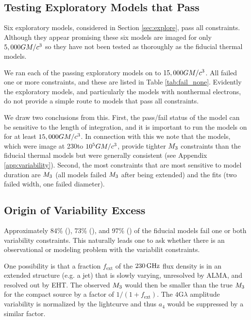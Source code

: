 \subsection{Testing Exploratory Models that Pass}

Six exploratory models, considered in Section \ref{sec:explore},  pass all constraints.  Although they appear promising these six models are imaged for only $5,000 GM/c^3$ so they have not been tested as thoroughly as the fiducial thermal models.  

We ran each of the passing exploratory models on to $15,000 GM/c^3$.  All failed one or more constraints, and these are listed in Table \ref{tab:fail_none}.  Evidently the exploratory models, and particularly the models with nonthermal electrons, do not provide a simple route to models that pass all constraints.  

We draw two conclusions from this.  First, the pass/fail status of the model can be sensitive to the length of integration, and it is important to run the models on for at least $15,000GM/c^3$.  In connection with this we note that the \koral models, which were image at 230\GHz to $10^5 GM/c^3$, provide tighter $M_{3}$ constraints than the fiducial thermal models but were generally consistent (see Appendix \ref{app:variability}).  Second, the most constraints that  are most sensitive to model duration are $M_{3}$ (all models failed $M_{3}$ after being extended) and the \mring fits (two failed \mring width, one failed \mring diameter). 

\subsection{Origin of Variability Excess}

Approximately 84\% (\kharma), 73\% (\bhac), and 97\% (\hamr) of the fiducial models fail one or both variability constraints.  This naturally leads one to ask whether there is an observational or modeling problem with the variabilit constraints.

One possibility is that a fraction $f_\mathrm{ext}$ of the $230\,\mathrm{GHz}$ flux density is in an extended structure (e.g. a jet) that is slowly varying, unresolved by ALMA, and resolved out by EHT.  The observed $M_{3}$ would then be smaller than the true $M_{3}$ for the compact source by a factor of $1/(1 + f_\mathrm{ext})$.  The $4$G$\lambda$ amplitude variability is normalized by the lightcurve and thus $a_4$ would be suppressed by a similar factor.


